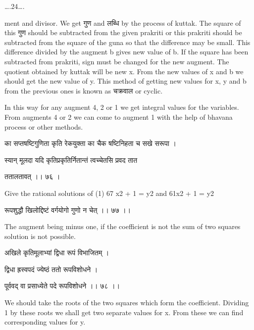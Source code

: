 \documentclass[]{article}
\date{}
\begin{document}
{\ldots{}.24\ldots{}.}

{ment and divisor. We get गुण and लब्धि by the process of kuttak. The
square of this गुण should be subtracted from the given prakriti or this
prakriti should be subtracted from the square of the guna so that the
difference may be small. This difference divided by the augment b gives
new value of b. If the square has been subtracted from prakriti, sign
must be changed for the new augment. The quotient obtained by kuttak
will be new x. From the new values of x and b we should get the new
value of y. This method of getting new values for x, y and b from the
previous ones is known as चक्रवाल or cyclic.}

{In this way for any augment 4, 2 or 1 we get integral values for the
variables. From augments 4 or 2 we can come to augment 1 with the help
of bhavana process or other methods.}

{का सप्तषष्टिगुणिता कृति रेकयुक्ता का चैक षष्टिनिहता च सखे सरूपा । }

{स्यान् मूलदा यदि कृतिप्रकृतिर्नितान्तं त्वच्चेतसि प्रवद तात }

{ततालतावत् ।। ७६ । }

{Give the rational solutions of (1) 67 x}{2}{ + 1 = y}{2}{ and 61x}{2}{
+ 1 = y}{2}

{रूपशुद्धौ खिलोद्दिष्टं वर्गयोगो गुणो न चेत् ।। ७७ ।।}{ }

{The augment being minus one, if the coefficient is not the sum of two
squares solution is not possible.}

{अखिले कृतिमूलाभ्यां द्विधा रूपं विभाजितम् । }

{द्विधा ह्रस्वपदं ज्येष्ठं ततो रूपविशोधने । }

{पूर्ववद् वा प्रसाध्येते पदे रूपविशोधने ।। ७८ ।। }

{We should take the roots of the two squares which form the coefficient.
Dividing 1 by these roots we shall get two separate values for x. From
these we can find corresponding values for y.\\
}
\end{document}
